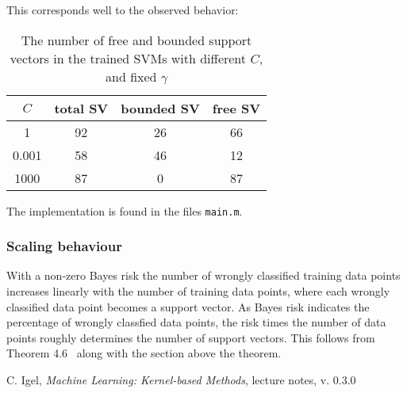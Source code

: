 \documentclass[a4paper, 11pt]{article}
\begin{document}
This corresponds well to the observed behavior:

\begin{table}[H]
\centering
\begin{tabular}{c|c|c|c}
    $C$      & total SV & bounded SV & free SV \\ \hline
    1      & 92       & 26         & 66      \\
    0.001  & 58       & 46         & 12      \\
    1000   & 87       & 0          & 87
\end{tabular}
\caption{The number of free and bounded support vectors in the trained SVMs with different $C$, and fixed $\gamma$}
\label{tab:SV}
\end{table}

The implementation is found in the files \texttt{main.m}.

\subsubsection{Scaling behaviour}
With a non-zero Bayes risk the number of wrongly classified training data points increases linearly with the number of training data points, where each wrongly classified data point becomes a support vector. As Bayes risk indicates the percentage of wrongly classfied data points, the risk times the number of data points roughly determines the number of support vectors. This follows from Theorem 4.6~\cite{book:KBML} along with the section above the theorem.

\begin{thebibliography}{9}

 C. Igel, \emph{Machine Learning: Kernel-based Methods}, lecture notes, v. 0.3.0

\end{thebibliography}
\end{document}
